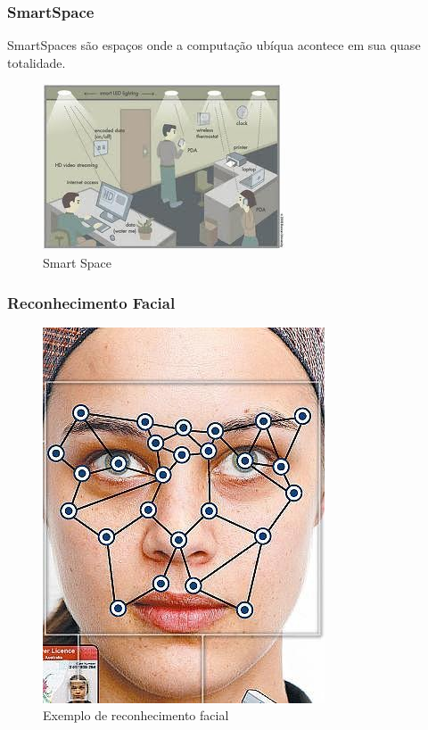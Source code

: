 \documentclass{beamer}
\begin{document}
\begin{frame}
    \frametitle{SmartSpace}

    SmartSpaces são espaços onde a computação ubíqua acontece em sua quase totalidade.
    
    \begin{figure}[h]
    	\centering \includegraphics[scale=0.35]{figuras/smartSpace.jpg}
    	\caption{Smart Space}
    	\label{smart_space} 
    \end{figure}
\end{frame}

\begin{frame}
    \frametitle{Reconhecimento Facial}
    
    \begin{figure}[h]
	\centering \includegraphics[scale=0.4]{figuras/face-recognition.jpg}
    	\caption{Exemplo de reconhecimento facial}
    	\label{reconhecimento_facial}
    \end{figure}
\end{frame}
\end{document}
